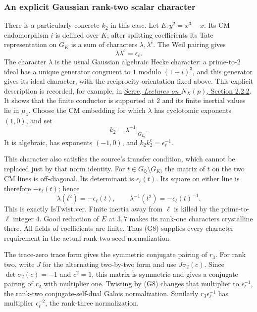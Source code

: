 \subsubsection{An explicit Gaussian rank-two scalar character}
There is a particularly concrete \(k_2\) in this case.
Let \(E:y^2=x^3-x\).
Its CM endomorphism \(i\) is defined over \(K\);
after splitting coefficients its Tate representation on
\(G_K\) is a sum of characters \(\lambda,\lambda^c\).
The Weil pairing gives
\[
                              \lambda\lambda^c=\epsilon_\ell .
\]
The character \(\lambda\) is the usual Gaussian
algebraic Hecke character: a prime-to-\(2\) ideal has
a unique generator congruent to \(1\) modulo
\((1+i)^3\), and this generator gives its ideal
character, with the reciprocity orientation fixed above.
This explicit description is recorded, for example, in
\href{https://www.college-de-france.fr/media/professeurs-honoraires/UPL6386850193290496047_cours_Taiwan_avril__10juin_2011__5.pdf}
{Serre, \emph{Lectures on \(N_X(p)\)}, Section 2.2.2}.
It shows that the finite conductor is supported at \(2\)
and its finite inertial values lie in \(\mu_4\).
Choose the CM embedding for which \(\lambda\) has
cyclotomic exponents \((1,0)\), and set
\[
                                  k_2=\lambda^{-1}|_{G_{L_r}} .
 \tag{G8}
\]
It is algebraic, has exponents \((-1,0)\), and
\(k_2k_2^c=\epsilon_\ell^{-1}\).

This character also satisfies the source's transfer
condition, which cannot be replaced just by that norm
identity.
For \(t\in G_{\mathbb Q}\setminus G_K\), the matrix of
\(t\) on the two CM lines is off-diagonal.
Its determinant is \(\epsilon_\ell(t)\).
Its square on either line is therefore
\(-\epsilon_\ell(t)\); hence
\[
              \lambda(t^2)=-\epsilon_\ell(t),\qquad
              \lambda^{-1}(t^2)=-\epsilon_\ell(t)^{-1}.
 \tag{G9}
\]
This is exactly \(\mathrm{IsTwist.ver}\).
Finite inertia away from \(\ell\) is killed by the
prime-to-\(\ell\) integer \(4\).
Good reduction of \(E\) at \(3,7\) makes its rank-one
characters crystalline there.
All fields of coefficients are finite.
Thus (G8) supplies every character requirement in
the actual rank-two seed normalization.

The trace-zero trace form gives the symmetric
conjugate pairing of \(r_3\).
For rank two, write \(J\) for the alternating
two-by-two form and use \(J\sigma_2(c)\).
Since \(\det\sigma_2(c)=-1\) and \(c^2=1\),
this matrix is symmetric and gives a conjugate pairing
of \(r_2\) with multiplier one.
Twisting by (G8) changes that multiplier to
\(\epsilon_\ell^{-1}\), the rank-two conjugate-self-dual
Galois normalization.
Similarly \(r_3\epsilon_\ell^{-1}\) has multiplier
\(\epsilon_\ell^{-2}\), the rank-three normalization.

